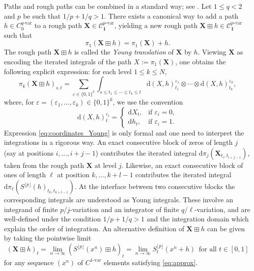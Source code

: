 \documentclass[12pt,a4paper]{article}
\numberwithin{equation}{section}
\newcommand\hugo[1]{\textcolor{blue}{\textit{(hugo) #1}}}
\theoremstyle{plain}
\theoremstyle{definition}
\theoremstyle{remark}
\begin{document}
Paths and rough paths can be combined in a standard way; see \cite[Theorem 9.33]{frizbook}. Let \(1 \le q < 2\) and \(p\) be such that \(1/p + 1/q > 1\). There exists a canonical way to add a path \(h \in C^{q\text{-var}}_0\) to a rough path \(\mathbf{X} \in \mathcal{C}^{p\text{-var}}_{\mathbf{1}}\), yielding a new rough path \(\mathbf{X} \boxplus h \in \mathcal{C}^{p\text{-var}}_{\mathbf{1}}\) such that
\[
\pi_1(\mathbf{X} \boxplus h) = \pi_1(\mathbf{X}) + h.
\]
The rough path \(\mathbf{X} \boxplus h\) is called the \emph{Young translation} of \(\mathbf{X}\) by \(h\). Viewing \(\mathbf{X}\) as encoding the iterated integrals of the path \(X := \pi_1(\mathbf{X})\), one obtains the following explicit expression: for each level \(1 \le k \le N\),
\begin{equation}\label{eq:coordinates_Young}
\pi_k(\mathbf{X} \boxplus h)_{s,t}
= \sum_{\varepsilon \in \{0,1\}^k}
\int_{s \le t_1 \le \cdots \le t_k \le t}
\mathrm{d}(X,h)^{\varepsilon_1}_{t_1} \otimes \cdots \otimes \mathrm{d}(X,h)^{\varepsilon_k}_{t_k},
\end{equation}
where, for \(\varepsilon = (\varepsilon_1,\dots,\varepsilon_k) \in \{0,1\}^k\), we use the convention
\[
\mathrm{d}(X,h)^{\varepsilon_i}_t =
\begin{cases}
\mathrm{d}X_t, & \text{if } \varepsilon_i = 0,\\
\mathrm{d}h_t, & \text{if } \varepsilon_i = 1.
\end{cases}
\]
Expression \eqref{eq:coordinates_Young} is only formal and one need to interpret the integrations in a rigorous way. An exact consecutive block of zeros of length \(j\) (say at positions \(i,\dots,i+j-1\)) contributes  the iterated integral \(\mathrm{d}\pi_j(\mathbf{X}_{t_i,t_{i+j-1}})\), taken from the rough path \(\mathbf{X}\) at level \(j\). Likewise, an exact consecutive block of ones of length \(\ell\) at position $k,\dots ,k+l-1$ contributes the iterated integral \(\mathrm{d}\pi_\ell(S^{\lfloor p \rfloor}(h)_{t_k,t_{k+l-1}})\). At the interface between two consecutive blocks the corresponding integrals are understood as Young integrals. These involve an integrand of finite \(p/j\)-variation and an integrator of finite \(q/\ell\)-variation, and are well-defined under the condition \(1/p + 1/q > 1\) and the integration domain which explain the order of integration. An alternative definition of $\mathbf{X} \boxplus h$ can be given by taking the pointwise limit
\begin{equation}\label{eq:pointwise}
(\mathbf{X} \boxplus h)_t=\lim_{n \to \infty} (S^{\lfloor p \rfloor}(x^n)\boxplus h)_t= \lim_{n \to \infty} S_t^{\lfloor p \rfloor}(x^n + h)\, \text{    for all $t \in [0,1]$}
\end{equation}
for any sequence $(x^n)$ of $C^{1\text{-var}}$ elements satisfying \eqref{eq:approx}.
\end{document}
